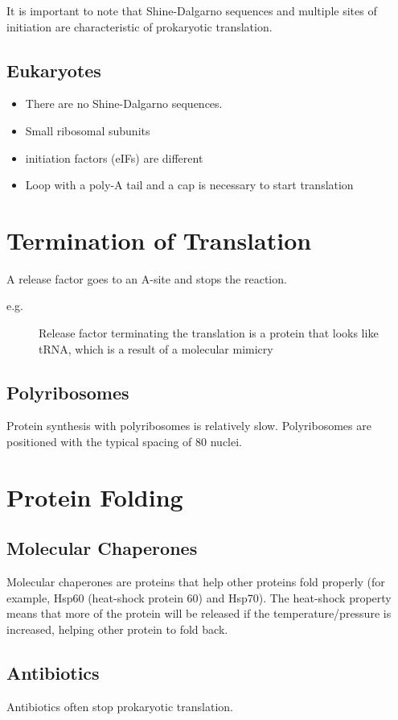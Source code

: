 \documentclass[11pt]{scrartcl}
\begin{document}
It is important to note that Shine-Dalgarno sequences and multiple sites of initiation are characteristic of prokaryotic translation.

\subsection{Eukaryotes}

\begin{itemize}
\item There are no Shine-Dalgarno sequences.
\item Small ribosomal subunits
\item initiation factors (eIFs) are different
\item Loop with a poly-A tail and a cap is necessary to start translation
\end{itemize}

\section{Termination of Translation}

A release factor goes to an A-site and stops the reaction.

\begin{description}

\item[e.g.] Release factor terminating the translation is a protein that looks like tRNA, which is a result of a molecular mimicry 

\end{description}

\subsection{Polyribosomes}

Protein synthesis with polyribosomes is relatively slow. Polyribosomes are positioned with the typical spacing of 80 nuclei.

\section{Protein Folding}
\subsection{Molecular Chaperones}
\begin{definition}
  Molecular chaperones are proteins that help other proteins fold properly (for example, Hsp60 (heat-shock protein 60) and Hsp70). The heat-shock property means that more of the protein will be released if the temperature/pressure is increased, helping other protein to fold back. 
\end{definition}

\subsection{Antibiotics}

Antibiotics often stop prokaryotic translation. 
\end{document}
